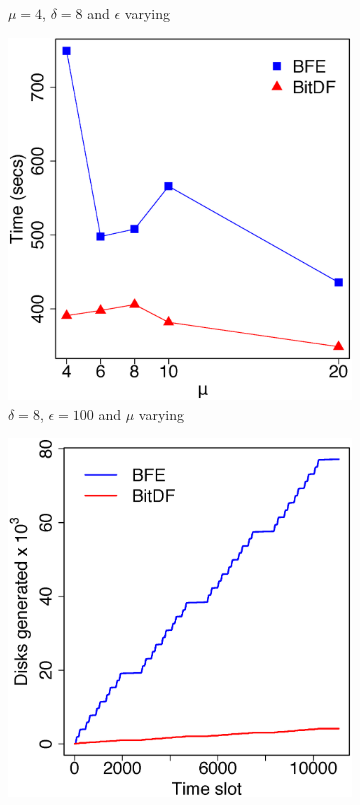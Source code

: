 \begin{figure}
\begin{subfigure}[t]{0.25\textwidth}
        \caption{$\mu = 4$, $\delta = 8$ and $\epsilon$ varying}
        \label{fig:berlinmod_vary_g}
    \end{subfigure}
    \begin{subfigure}[t]{0.25\textwidth}
        \includegraphics[width=\textwidth]{images/BerlinMOD_l_8_g_100_varying_n.eps}
        \caption{$\delta = 8$, $\epsilon = 100$ and $\mu$ varying}
        \label{fig:berlinmod_vary_n}
    \end{subfigure}
    \begin{subfigure}[t]{0.25\textwidth}
        \includegraphics[width=\textwidth]{images/BerlinMOD_d.eps}

\end{subfigure}
\end{figure}
